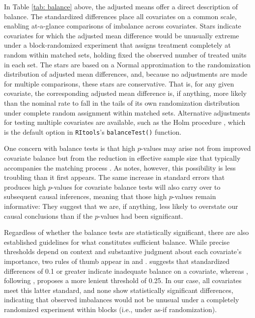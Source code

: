 \documentclass[
  12pt,
  leqno]{article}
\begin{document}
In Table \ref{tab: balance} above, the adjusted means offer a direct
description of balance. The standardized differences place all
covariates on a common scale, enabling at-a-glance comparisons of
imbalance across covariates. Stars indicate covariates for which the
adjusted mean difference would be unusually extreme under a
block-randomized experiment that assigns treatment completely at random
within matched sets, holding fixed the observed number of treated units
in each set. The stars are based on a Normal approximation to the
randomization distribution of adjusted mean differences, and, because no
adjustments are made for multiple comparisons, these stars are
conservative. That is, for any given covariate, the corresponding
adjusted mean difference is, if anything, more likely than the nominal
rate to fall in the tails of its own randomization distribution under
complete random assignment within matched sets. Alternative adjustments
for testing multiple covariates are available, such as the Holm
procedure \citep{holm1979}, which is the default option in
\texttt{RItools}'s \texttt{balanceTest()} function.

One concern with balance tests is that high \(p\)-values may arise not
from improved covariate balance but from the reduction in effective
sample size that typically accompanies the matching process
\citep{austin2008, imaietal2008}. As \citet{hansen2008b} notes, however,
this possibility is less troubling than it first appears. The same
increase in standard errors that produces high \(p\)-values for
covariate balance tests will also carry over to subsequent causal
inferences, meaning that those high \(p\)-values remain informative:
They suggest that we are, if anything, less likely to overstate our
causal conclusions than if the \(p\)-values had been significant.

Regardless of whether the balance tests are statistically significant,
there are also established guidelines for what constitutes sufficient
balance. While precise thresholds depend on context and substantive
judgment about each covariate's importance, two rules of thumb appear in
\citet{austin2009} and \citet{stuart2010}. \citet{austin2009} suggests
that standardized differences of 0.1 or greater indicate inadequate
balance on a covariate, whereas \citet{stuart2010}, following
\citet{rubin2001}, proposes a more lenient threshold of 0.25. In our
case, all covariates meet this latter standard, and none show
statistically significant differences, indicating that observed
imbalances would not be unusual under a completely randomized experiment
within blocks (i.e., under as-if randomization).
\end{document}
